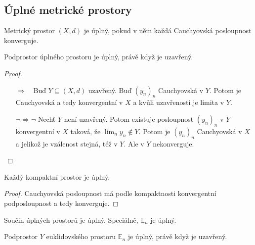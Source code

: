 \documentclass[../main.tex]{subfiles}
\begin{document}
\subsection{Úplné metrické prostory}

\begin{definition}
	Metrický prostor $(X,d)$ je úplný, pokud v něm každá Cauchyovská posloupnost konverguje.
\end{definition}

\begin{lemma}
	Podprostor úplného prostoru je úplný, právě když je uzavřený.
\end{lemma}

\begin{proof}
	\begin{enumerate}
		\item[$\Rightarrow \phantom{\lnot} $] Buď $Y \subseteq (X,d)$ uzavřený. Buď $(y_n)_n$ Cauchyovská v $Y$. Potom je Cauchyovská 
	    a tedy konvergentní v $X$ a kvůli uzavřenosti je limita v $Y$.
	    \item[$\lnot \Rightarrow \lnot $] Nechť $Y$ není uzavřený. Potom existuje posloupnost $(y_n)_n$ v $Y$ konvergentní v $X$ taková, že $\lim_n y_n \notin Y$.
	    Potom je $(y_n)_n$ Cauchyovská v $X$ a jelikož je vzálenost stejná, též v $Y$. Ale v $Y$ nekonverguje.
	\end{enumerate}
\end{proof}

\begin{lemma}
	Každý kompaktní prostor je úplný.
\end{lemma}

\begin{proof}
	Cauchyovská posloupnost má podle kompaktnosti konvergentní podposloupnost a tedy konverguje.
\end{proof}

\begin{theorem}
	Součin úplných prostorů je úplný. Speciálně, $\mathbb{E}_n$ je úplný.
\end{theorem}

\begin{consequence}
	Podprostor $Y$ euklidovského prostoru $\mathbb{E}_n$ je úplný, právě když je uzavřený.
\end{consequence}
\end{document}
